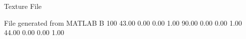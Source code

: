 Texture File

File generated from MATLAB
B 100
   43.00   0.00   0.00   1.00
   90.00   0.00   0.00   1.00
   44.00   0.00   0.00   1.00